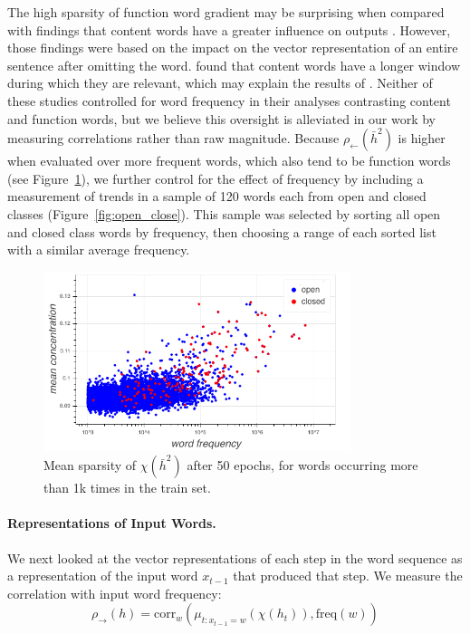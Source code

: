 The high sparsity of function word gradient may be surprising when compared with findings that content words have a greater influence on outputs \citep{kadar_representation_2016}. However, those findings were based on the impact on the vector representation of an entire sentence after omitting the word. \citet{khandelwal_sharp_2018} found that content words have a longer window during which they are relevant, which may explain the results of \citet{kadar_representation_2016}. Neither of these studies controlled for word frequency in their analyses contrasting content and function words,  but we believe this oversight is alleviated in our work by measuring correlations rather than raw magnitude. Because $\rho_{\leftarrow}(\bar{h}^2)$ is higher when evaluated over more frequent words, which also tend to be function words (see Figure~\ref{fig:scatterplot}), we further control for the effect of frequency by including a measurement of trends in a sample of 120 words each from open and closed classes (Figure~\ref{fig:open_close}). This sample was selected by sorting all open and closed class words by frequency, then choosing a range of each sorted list with a similar average frequency.



\begin{figure}\centering
\includegraphics[width=0.8\textwidth]{sparsity/scatter}
\caption{Mean sparsity of $\chi(\bar{h}^{2})$ after 50 epochs, for words occurring more than 1k times in the train set.}
 \label{fig:scatterplot}
\end{figure}


\paragraph{Representations of Input Words.} We next looked at the vector representations of each step in the word sequence as a representation of the input word $x_{t-1}$ that produced that step. We measure the correlation with input word frequency:
$$\rho_{\rightarrow}(h) = \textrm{corr}_w(\mu_{t: x_{t-1} = w}(\chi(h_t)), \textrm{freq}(w))$$

